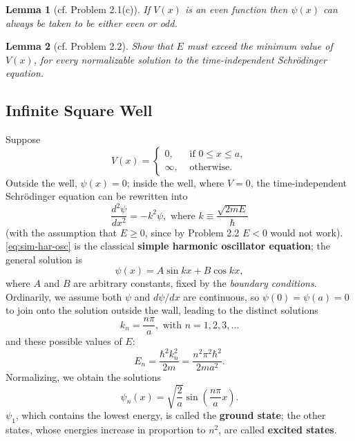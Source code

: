 \documentclass{article}
\newtheorem*{lemma*}{Lemma}
\begin{document}
\begin{lemma*}[cf. Problem 2.1(c)]
  If $V(x)$ is an even function then $\psi(x)$ can always be taken to be either
  even or odd.
\end{lemma*}

\begin{lemma*}[cf. Problem 2.2]
  Show that $E$ must exceed the minimum value of $V(x)$, for every normalizable
  solution to the time-independent Schr\"{o}dinger equation.
\end{lemma*}

\subsection{Infinite Square Well}

Suppose
\begin{equation} \label{eq:inf-sq-well}
  V(x) =
  \begin{cases}
    0, &\text{ if } 0 \leq x \leq a, \\
    \infty, &\text{ otherwise}.
  \end{cases}
\end{equation}
Outside the well, $\psi(x) = 0$; inside the well, where $V = 0$, the
time-independent Schr\"{o}dinger equation can be rewritten into
\begin{equation} \label{eq:sim-har-osc}
  \frac{d^2\psi}{dx^2} = -k^2\psi,
  \text{ where } k \equiv \frac{\sqrt{2mE}}{\hbar}
\end{equation}
(with the assumption that $E \geq 0$, since by Problem 2.2 $E < 0$ would not
work). \eqref{eq:sim-har-osc} is the classical \textbf{simple harmonic
  oscillator equation}; the general solution is \[
  \psi(x) = A \sin kx + B \cos kx,
  \] where $A$ and $B$ are arbitrary constants, fixed by the \emph{boundary
conditions}. Ordinarily, we assume both $\psi$ and $d\psi/dx$ are continuous,
so $\psi(0) = \psi(a) = 0$ to join onto the solution outside the wall, leading
to the distinct solutions
\begin{equation} \label{eq:sim-har-osc-kn}
  k_n = \frac{n\pi}{a}, \text{ with } n = 1, 2, 3, \ldots
\end{equation}
and these possible values of $E$:
\begin{equation} \label{eq:sim-har-osc-ene}
  \boxed{
    E_n = \frac{\hbar^2k_n^2}{2m} = \frac{n^2\pi^2\hbar^2}{2ma^2}.
  }
\end{equation}
Normalizing, we obtain the solutions
\begin{equation} \label{eq:sim-har-osc-psi}
  \boxed{
    \psi_n(x) = \sqrt{\frac{2}{a}} \sin\left(\frac{n\pi}{a}x\right).
  }
\end{equation}
$\psi_1$, which contains the lowest energy, is called the \textbf{ground
state}; the other states, whose energies increase in proportion to $n^2$, are
called \textbf{excited states}.
\end{document}
